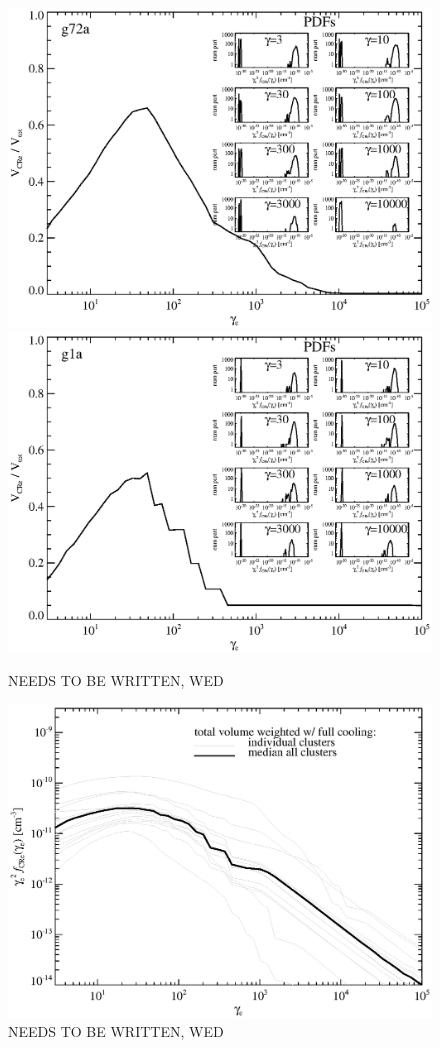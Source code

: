 \documentclass[useAMS,usenatbib]{mn2e}
\begin{document}
\begin{figure}
\begin{minipage}{2.0\columnwidth}
  \includegraphics[width=0.49\columnwidth]{./figures/CRvolume.g72a.1.4Rv.a24.full.140.v20.eps}
  \includegraphics[width=0.49\columnwidth]{./figures/CRvolume.g1a.1.4Rv.a24.full.020.v20.eps}
  \caption{NEEDS TO BE WRITTEN, WED}
\end{minipage}
\end{figure}

\begin{figure}
  \includegraphics[width=1.0\columnwidth]{./figures/CRespec.all.1.4Rv.a24.full.020.v20.eps}
  \caption{NEEDS TO BE WRITTEN, WED}
\end{figure}
\end{document}
